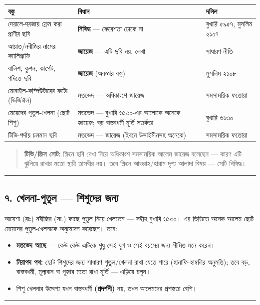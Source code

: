 \begin{table}[h]\centering\small
\begin{tabular}{lll}
বস্তু & বিধান & দলিল \\
\hline
দেয়ালে-দরজায় ফ্রেম করা প্রাণীর ছবি & \textbf{নিষিদ্ধ} — ফেরেশতা ঢোকে না & বুখারি ৫৯৫৭, মুসলিম ২১০৭ \\
আয়াত/নবীজির নামের ক্যালিগ্রাফি & \textbf{জায়েজ} — এটি ছবি নয়, লেখা & সাধারণ নীতি \\
বালিশ, কুশন, কার্পেট, গদিতে ছবি & \textbf{জায়েজ} (অবজ্ঞার বস্তু) & মুসলিম ২১০৮ \\
মোবাইল-কম্পিউটারের ফটো (ডিজিটাল) & মতভেদ — অধিকাংশে জায়েজ & সমসাময়িক ফতোয়া \\
মেয়েদের পুতুল-খেলনা (ছোট শিশু) & মতভেদ — বুখারি ৬১৩০-এর আলোকে অনেকে জায়েজ; বড় বাস্তবধর্মী মূর্তি সতর্কতা & বুখারি ৬১৩০ \\
টিভি-পর্দায় চলমান ছবি & মতভেদ — জায়েজ (ইবনে উসাইমীনসহ অনেকে) & সমসাময়িক ফতোয়া \\
\hline
\end{tabular}
\end{table}

\begin{quote}
\textbf{টিভি/স্ক্রিন নোট:} স্ক্রিনে ছবি দেখা নিয়ে অধিকাংশ সমসাময়িক আলেম জায়েজ বলেছেন — কারণ এটি ঝুলিয়ে রাখার মতো স্থায়ী তাসবীর নয়। তবে স্ক্রিনে আওরাহ/হারাম দৃশ্য আলাদা বিষয় — সেটি নিষিদ্ধ।
\end{quote}

\medskip\hrule\medskip

\subsection*{৭. খেলনা-পুতুল — শিশুদের জন্য}

আয়েশা (রাঃ) নবীজির (সা.) কাছে পুতুল নিয়ে খেলতেন — সহীহ বুখারি ৬১৩০। এর ভিত্তিতে অনেক আলেম ছোট মেয়েদের পুতুল-খেলনাকে অনুমোদন করেছেন। তবে:

\begin{itemize}
\item \textbf{মতভেদ আছে} — কেউ কেউ এটিকে শুধু সেই যুগ ও সেই বয়সের জন্য সীমিত মনে করেন।
\item \textbf{নিরাপদ পথ:} ছোট শিশুদের জন্য সাধারণ পুতুল/খেলনা রাখা যেতে পারে (হানাফি-হাম্বলির অনুমতি); তবে বড়, বাস্তবধর্মী, মূল্যবান বা পূজার মতো রাখা মূর্তি — এড়িয়ে চলুন।
\item শিশু খেলনার উদ্দেশ্য যখন বাস্তবধর্মী \textbf{ (প্রদর্শনী)} নয়, তখন আলেমদের প্রশস্ততা বেশি।
\end{itemize}
\medskip\hrule\medskip

